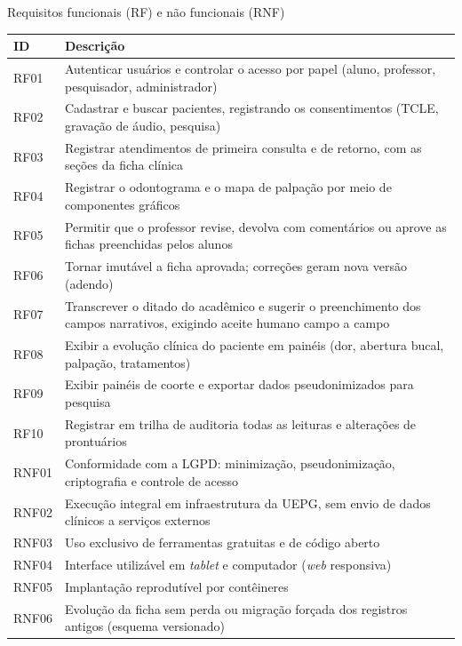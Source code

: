 \begin{quadro}[htbp]
	\caption{Requisitos funcionais (RF) e não funcionais (RNF)}
	\label{qua:requisitos}
	\footnotesize
	\begin{tabularx}{\textwidth}{|L{1.2cm}|Y|}
		\hline
		\textbf{ID} & \textbf{Descrição} \\ \hline
		RF01 & Autenticar usuários e controlar o acesso por papel (aluno, professor, pesquisador, administrador) \\ \hline
		RF02 & Cadastrar e buscar pacientes, registrando os consentimentos (TCLE, gravação de áudio, pesquisa) \\ \hline
		RF03 & Registrar atendimentos de primeira consulta e de retorno, com as seções da ficha clínica \\ \hline
		RF04 & Registrar o odontograma e o mapa de palpação por meio de componentes gráficos \\ \hline
		RF05 & Permitir que o professor revise, devolva com comentários ou aprove as fichas preenchidas pelos alunos \\ \hline
		RF06 & Tornar imutável a ficha aprovada; correções geram nova versão (adendo) \\ \hline
		RF07 & Transcrever o ditado do acadêmico e sugerir o preenchimento dos campos narrativos, exigindo aceite humano campo a campo \\ \hline
		RF08 & Exibir a evolução clínica do paciente em painéis (dor, abertura bucal, palpação, tratamentos) \\ \hline
		RF09 & Exibir painéis de coorte e exportar dados pseudonimizados para pesquisa \\ \hline
		RF10 & Registrar em trilha de auditoria todas as leituras e alterações de prontuários \\ \hline
		RNF01 & Conformidade com a LGPD: minimização, pseudonimização, criptografia e controle de acesso \\ \hline
		RNF02 & Execução integral em infraestrutura da UEPG, sem envio de dados clínicos a serviços externos \\ \hline
		RNF03 & Uso exclusivo de ferramentas gratuitas e de código aberto \\ \hline
		RNF04 & Interface utilizável em \textit{tablet} e computador (\textit{web} responsiva) \\ \hline
		RNF05 & Implantação reprodutível por contêineres \\ \hline
		RNF06 & Evolução da ficha sem perda ou migração forçada dos registros antigos (esquema versionado) \\ \hline
	\end{tabularx}
\end{quadro}

